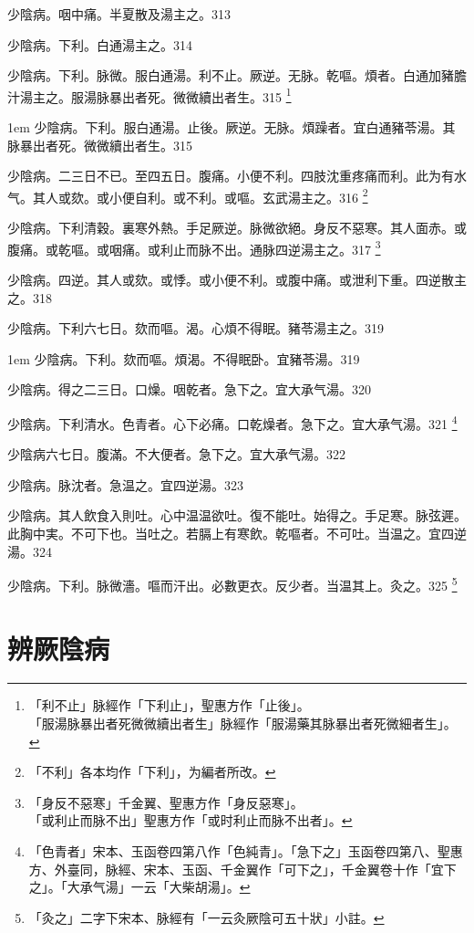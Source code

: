 少陰病。咽中痛。半夏散及湯主之。313

少陰病。下利。白通湯主之。314

少陰病。下利。脉微。服白通湯。利不止。厥逆。无脉。乾嘔。煩者。白通加豬膽汁湯主之。服湯脉暴出者死。微{\khaaitp 微}續{\khaaitp 出}者生。315
	\footnote{「利不止」脉經作「下利止」，聖惠方作「止後」。\\「服湯脉暴出者死微微續出者生」脉經作「服湯藥其脉暴出者死微細者生」。}

\hangindent 1em
少陰病。下利。服白通湯。止後。厥逆。无脉。煩躁者。宜白通豬苓湯。其脉暴出者死。微微續出者生。{\gaoben}315

少陰病。二三日不已。至四五日。腹痛。小便不利。四肢沈重疼痛而利。此为有水气。其人或欬。或小便{\khaaitp 自}利。或不利。或嘔。玄武湯主之。316
	\footnote{「不利」各本均作「下利」，为編者所改。}

少陰病。下利清穀。裏寒外熱。手足厥逆。脉微欲絕。身反不惡寒。其人面赤。或腹痛。或乾嘔。或咽痛。或利止{\khaaitp 而}脉不出。通脉四逆湯主之。317
	\footnote{「身反不惡寒」千金翼、聖惠方作「身反惡寒」。\\「或利止而脉不出」聖惠方作「或时利止而脉不出者」。}

少陰病。四逆。其人或欬。或悸。或小便不利。或腹中痛。或泄利下重。四逆散主之。318

少陰病。下利六七日。欬而嘔。渴。心煩不得眠。豬苓湯主之。319

\hangindent 1em
少陰病。下利。欬而嘔。煩渴。不得眠卧。宜豬苓湯。{\gaoben}319

少陰病。得之二三日。口燥。咽乾者。急下之。宜{\khaaitp 大}承气湯。320

少陰病。{\khaaitp 下}利清水。色青者。心下必痛。口乾燥者。急下之。宜{\khaaitp 大}承气湯。321
	\footnote{
		「色青者」宋本、玉函卷四第八作「色純青」。「急下之」玉函卷四第八、聖惠方、外臺同，脉經、宋本、玉函、千金翼作「可下之」，千金翼卷十作「宜下之」。「大承气湯」一云「大柴胡湯」。
	}

少陰病六七日。腹滿。不大便者。急下之。宜{\khaaitp 大}承气湯。322

少陰病。脉沈者。急温之。宜四逆湯。323

少陰病。其人飲食入則吐。心中温温欲吐。復不能吐。始得之。手足寒。脉弦遲。此胸中実。不可下也。当吐之。若膈上有寒飲。乾嘔者。不可吐。当温之。宜四逆湯。324

少陰病。下利。脉微濇。嘔而汗出。必數更衣。反少者。当温其上。灸之。325
	\footnote{「灸之」二字下宋本、脉經有「一云灸厥陰可五十狀」小註。}

\chapter{辨厥陰病}

